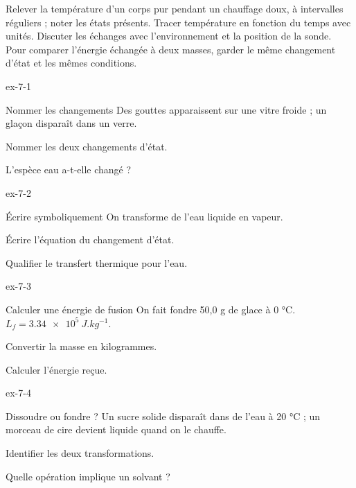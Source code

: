 \begin{experience}Relever la température d'un corps pur pendant un chauffage doux, à intervalles réguliers ; noter les états présents. Tracer température en fonction du temps avec unités. Discuter les échanges avec l'environnement et la position de la sonde. Pour comparer l'énergie échangée à deux masses, garder le même changement d'état et les mêmes conditions.\end{experience}
\exercices
{}
\begin{blocLivre}{ex-7-1}\begin{exercice}[1]{Nommer les changements}
Des gouttes apparaissent sur une vitre froide ; un glaçon disparaît dans un verre.
\begin{questions}
\item Nommer les deux changements d’état.
\item L’espèce eau a-t-elle changé ?
\end{questions}
\end{exercice}\end{blocLivre}
\begin{blocLivre}{ex-7-2}\begin{exercice}[1]{Écrire symboliquement}
On transforme de l’eau liquide en vapeur.
\begin{questions}
\item Écrire l’équation du changement d’état.
\item Qualifier le transfert thermique pour l’eau.
\end{questions}
\end{exercice}\end{blocLivre}
\begin{blocLivre}{ex-7-3}\begin{exercice}[1]{Calculer une énergie de fusion}
On fait fondre 50,0 g de glace à 0 °C. $L_f=\qty{3,34e5}{J.kg^{-1}}$.
\begin{questions}
\item Convertir la masse en kilogrammes.
\item Calculer l’énergie reçue.
\end{questions}
\end{exercice}\end{blocLivre}
\begin{blocLivre}{ex-7-4}\begin{exercice}[1]{Dissoudre ou fondre ?}
Un sucre solide disparaît dans de l’eau à 20 °C ; un morceau de cire devient liquide quand on le chauffe.
\begin{questions}
\item Identifier les deux transformations.
\item Quelle opération implique un solvant ?
\end{questions}
\end{exercice}\end{blocLivre}

